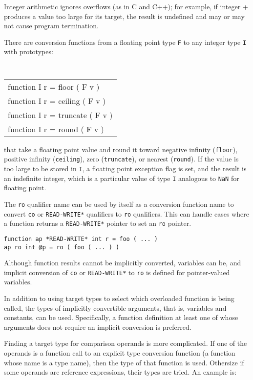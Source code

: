 \documentclass[12pt]{article}
\newenvironment{indpar}[1][0.3in]%
	{\begin{list}{}%
		     {\setlength{\itemsep}{0in}%
		      \setlength{\topsep}{0in}%
		      \setlength{\parsep}{1ex}%
		      \setlength{\labelwidth}{#1}%
		      \setlength{\leftmargin}{#1}%
		      \addtolength{\leftmargin}{\labelsep}}%
	 \item}%
	{\end{list}}
\begin{document}
Integer arithmetic ignores overflows (as in C and C++); for example,
if integer + produces a value too large for its
target, the result is undefined and may or may not cause program
termination.

There are conversion functions from a floating
point type {\tt F} to any integer type {\tt I} with prototypes:
\begin{center} \tt
\begin{tabular}{l}
function I r = floor ( F v ) \\
function I r = ceiling ( F v ) \\
function I r = truncate  ( F v ) \\
function I r = round ( F v ) \\
\end{tabular}
\end{center}
that take a floating point value and round it toward
negative infinity ({\tt floor}),
positive infinity ({\tt ceiling}),
zero ({\tt truncate}),
or nearest ({\tt round}).  If the value is too large to be stored
in {\tt I}, a floating point exception flag is set, and
the result is an indefinite integer, which is
a particular value of type {\tt I} analogous to {\tt NaN}
for floating point.

The {\tt ro} qualifier name can be used by itself as a
conversion function name to convert
{\tt co} or {\tt *READ-WRITE*} qualifiers to {\tt ro} qualifiers.
This can handle cases where a function returns a {\tt *READ-WRITE*}
pointer to set an {\tt ro} pointer.

\begin{indpar}\begin{verbatim}
function ap *READ-WRITE* int r = foo ( ... )
ap ro int @p = ro ( foo ( ... ) )
\end{verbatim}\end{indpar}

Although function results cannot be implicitly converted, variables
can be, and implicit conversion of {\tt co} or {\tt *READ-WRITE*} to
{\tt ro} is defined for pointer-valued variables.

In addition to using target types to select which overloaded
function is being called, the types of implicitly convertible
arguments, that is, variables and constants, can be used.
Specifically, a function definition at least one of whose arguments
does not require an implicit conversion is preferred.

Finding a target type for comparison operands is more complicated.
If one of the operands is a function call to an explicit type conversion
function (a function whose name is a type name), then the type of
that function is used.  Othersize if some operands are reference
expressions, their types are tried.  An example is:
\end{document}
